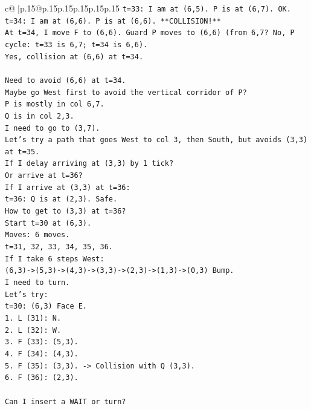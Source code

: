 \documentclass{article}
\begin{document}
{\begin{supertabular}{c@{$\;$}|p{.15\linewidth}@{}p{.15\linewidth}p{.15\linewidth}p{.15\linewidth}p{.15\linewidth}p{.15\linewidth}}
{{{\texttt{t=33: I am at (6,5). P is at (6,7). OK.} \\
\texttt{t=34: I am at (6,6). P is at (6,6). **COLLISION!**} \\
\texttt{At t=34, I move F to (6,6). Guard P moves to (6,6) (from 6,7? No, P cycle: t=33 is 6,7; t=34 is 6,6).} \\
\texttt{Yes, collision at (6,6) at t=34.} \\
\\ 
\texttt{Need to avoid (6,6) at t=34.} \\
\texttt{Maybe go West first to avoid the vertical corridor of P?} \\
\texttt{P is mostly in col 6,7.} \\
\texttt{Q is in col 2,3.} \\
\texttt{I need to go to (3,7).} \\
\texttt{Let's try a path that goes West to col 3, then South, but avoids (3,3) at t=35.} \\
\texttt{If I delay arriving at (3,3) by 1 tick?} \\
\texttt{Or arrive at t=36?} \\
\texttt{If I arrive at (3,3) at t=36:} \\
\texttt{t=36: Q is at (2,3). Safe.} \\
\texttt{How to get to (3,3) at t=36?} \\
\texttt{Start t=30 at (6,3).} \\
\texttt{Moves: 6 moves.} \\
\texttt{t=31, 32, 33, 34, 35, 36.} \\
\texttt{If I take 6 steps West:} \\
\texttt{(6,3){-}>(5,3){-}>(4,3){-}>(3,3){-}>(2,3){-}>(1,3){-}>(0,3) Bump.} \\
\texttt{I need to turn.} \\
\texttt{Let's try:} \\
\texttt{t=30: (6,3) Face E.} \\
\texttt{1. L (31): N.} \\
\texttt{2. L (32): W.} \\
\texttt{3. F (33): (5,3).} \\
\texttt{4. F (34): (4,3).} \\
\texttt{5. F (35): (3,3). {-}> Collision with Q (3,3).} \\
\texttt{6. F (36): (2,3).} \\
\\ 
\texttt{Can I insert a WAIT or turn?} \\
}}}
\end{supertabular}}
\end{document}
